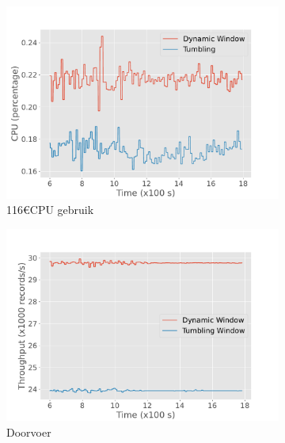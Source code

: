 \begin{figure}
    \begin{subfigure}[b]{0.5\columnwidth}
        \includegraphics[width=\columnwidth]{fig/periodic/cpu_comparison.pdf}
        116€{CPU gebruik}
        \label{fig:periodic_cpu}
    \end{subfigure}
    \hfill 
    \begin{subfigure}[b]{0.5\columnwidth}
        \includegraphics[width=\columnwidth]{fig/periodic/throughput_comparison.pdf}
        \caption{Doorvoer}
        \label{fig:periodic_throughput}
    \end{subfigure}
    \begin{subfigure}[b]{0.5\columnwidth}

\end{subfigure}
\end{figure}
